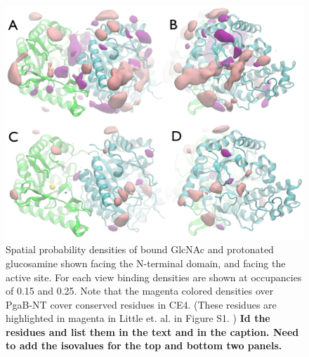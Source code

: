 

\begin{figure}[htbp]
\centering
\includegraphics[width=6.25in]{figures/results4/glcnac_glucosamine_merged_sdf.pdf}
\caption{Spatial probability densities of bound GlcNAc and protonated glucosamine shown  facing the N-terminal domain, and facing the active site.  For each view binding densities are shown at occupancies of 0.15 and 0.25.  Note that the magenta colored densities over PgaB-NT cover conserved residues in CE4.  (These residues are highlighted in magenta in Little et. al. in Figure S1. ) \textbf{Id the residues and list them in the text and in the caption. Need to add the isovalues for the top and bottom two panels.}}
\label{fig:sdf}
\end{figure}


